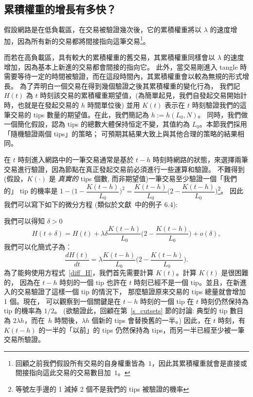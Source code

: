 \documentclass[12pt]{article}
\begin{document}
\begin{CJK}{UTF8}{bkai}
\subsection{累積權重的增長有多快？}
\label{s_cum_grow}

假設網路是在低負載區，在交易被驗證幾次後，它的累積權重將以 $\lambda$ 的速度增加，因為所有新的交易都將間接指向這筆交易\footnote{
回顧之前我們假設所有交易的自身權重皆為~$1$，因此其累積權重就會是直接或間接指向這此交易的交易數目加~$1$。}。

而若在高負載區，具有較大的累積權重的舊交易，其累積權重同樣會以 $\lambda$ 的速度增加，因為基本上新進的交易都會間接的指向它。
此外，當交易剛進入 tangle 時需要等待一定的時間被驗證，而在這段時間內，其累積權重會以較為無規的形式增長。
為了弄明白一個交易在得到幾個驗證之後其累積權重的變化行為，
我們記 $H(t)$ 為 $t$ 時刻該交易的累積權重期望值，(為簡單起見，我們自發起交易開始計時，也就是在發起交易的 $h$ 時間單位後)
並用 $K(t)$ 表示在 $t$ 時刻驗證我們的這筆交易的 tips 數量的期望值。在此，我們簡記為 $h:=h(L_0,N)$。
同時，我們做一個簡化假設，認為 tips 的總數大體保持恒定不變，其值約為 $L_0$。本節我們採用「隨機驗證兩個 tips」的策略；
可預期其結果大致上與其他合理的策略的結果相同。

在 $t$ 時刻進入網路中的一筆交易通常是基於 $t-h$ 時刻時網路的狀態，來選擇兩筆交易進行驗證，因為節點在真正發起交易前必須進行一些運算和驗證。
不難得到(假設，$K(\cdot)$ 是 \emph{真實的} tips 個數, 而非期望值)一筆交易至少驗證一個「我們的」 tip 的機率是 
$1-\big(1-\dfrac{K(t-h)}{L_0}\big)^2=\dfrac{K(t-h)}{L_0}\big(2-\dfrac{K(t-h)}{L_0}\big)$\footnote{
等號左手邊的 1 減掉 2 個不是我們的 tips 被驗證的機率}。
因此我們可以寫下如下的微分方程 (類似於文獻~\cite{Ross_m}中的例子 6.4):

我們可以得知 $\delta>0$
\[
 H(t+\delta) = H(t) 
+ \lambda \delta\frac{K(t-h)}{L_0}\Big(2-\frac{K(t-h)}{L_0}\Big)
 + o(\delta),
\]
我們可以化簡式子為︰
\begin{equation}
\label{diff_H}
 \frac{d H(t)}{dt} = \lambda \frac{K(t-h)}{L_0}\Big(2-\frac{K(t-h)}{L_0}\Big).
\end{equation}
為了能夠使用方程式~\eqref{diff_H}，我們首先需要計算 $K(t)$。計算 $K(t)$ 是很困難的，
因為在 $t-h$ 時刻的一個 tip 也許在 $t$ 時刻已經不是一個 tip。並且，在新進入的交易驗證了這樣一個 tip 的情況下，
那麼驗證原來交易的 tips 總量就會增加 1 個。現在，
可以觀察到一個關鍵是在 $t-h$ 時刻的一個 tip 在 $t$ 時刻仍然保持為 tip 的機率為 $1/2$。
(欲驗證此，回顧在第~\ref{s_cutsets} 節的討論: 典型的 tip 數目為 $2\lambda h$，而在~$h$ 時間後，$\lambda h$ 個新的 tips 會替換舊的一半。)
因此，在 $t$ 時刻，有 $K(t-h)$ 的一半的「以前」的 tips 仍然保持為 tips，而另一半已經至少被一筆交易所驗證。


\end{CJK}
\end{document}
